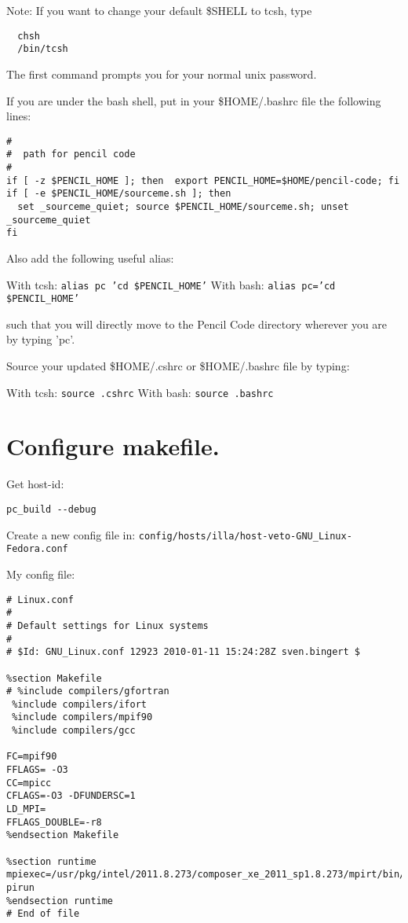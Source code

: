 \documentclass[a4paper,12pt]{article}
\begin{document}
Note: If you want to change your default \$SHELL to tcsh, type

\begin{verbatim}
  chsh
  /bin/tcsh
\end{verbatim}

The first command prompts you for your normal unix password.

If you are under the bash shell, put in your \$HOME/.bashrc file the following
lines:
\begin{verbatim}
#
#  path for pencil code
#
if [ -z $PENCIL_HOME ]; then  export PENCIL_HOME=$HOME/pencil-code; fi
if [ -e $PENCIL_HOME/sourceme.sh ]; then
  set _sourceme_quiet; source $PENCIL_HOME/sourceme.sh; unset _sourceme_quiet
fi
\end{verbatim}

 Also add the following useful alias:

With tcsh: \texttt{alias pc 'cd \$PENCIL\_HOME'}
With bash: \texttt{alias pc='cd \$PENCIL\_HOME'}

such that you will directly move to the Pencil Code directory wherever you are
by typing 'pc'.

Source your updated \$HOME/.cshrc or \$HOME/.bashrc file by typing:

With tcsh: \texttt{source .cshrc}
With bash: \texttt{source .bashrc}

\section{Configure makefile.}

Get host-id:
\begin{verbatim}
pc_build --debug
\end{verbatim}
Create a new config file in:
\texttt{config/hosts/illa/host-veto-GNU\_Linux-Fedora.conf}

My config file:
\begin{verbatim}
# Linux.conf
#
# Default settings for Linux systems
#
# $Id: GNU_Linux.conf 12923 2010-01-11 15:24:28Z sven.bingert $

%section Makefile
# %include compilers/gfortran
 %include compilers/ifort
 %include compilers/mpif90
 %include compilers/gcc

FC=mpif90 
FFLAGS= -O3  
CC=mpicc 
CFLAGS=-O3 -DFUNDERSC=1 
LD_MPI= 
FFLAGS_DOUBLE=-r8 
%endsection Makefile

%section runtime
mpiexec=/usr/pkg/intel/2011.8.273/composer_xe_2011_sp1.8.273/mpirt/bin/intel64/m
pirun
%endsection runtime
# End of file
\end{verbatim}
\end{document}
